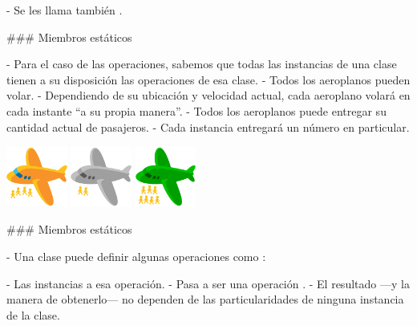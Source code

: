 \finishrboxx

- Se les llama también .

### Miembros estáticos


- Para el caso de las operaciones, sabemos que todas las instancias de una clase
tienen a su disposición las operaciones de esa clase.
    - Todos los aeroplanos pueden volar.
        - Dependiendo de su ubicación y velocidad actual, cada aeroplano volará en cada instante
        ``a su propia manera''.
    - Todos los aeroplanos puede entregar su cantidad actual de pasajeros.
        - Cada instancia entregará un número en particular.

\vfill

\columnsbegin
{}
\centering\includegraphics[width=20mm]{icons/92-emoji_android_airplane_withpeople.png}
\centering\includegraphics[width=20mm]{icons/92-emoji_android_airplane_gray_withpeople.png}
\centering\includegraphics[width=20mm]{icons/92-emoji_android_airplane_green_withpeople.png}
\columnsend

### Miembros estáticos


- Una clase puede definir algunas operaciones como :

\buildrboxx[0.9\textwidth]{}

- Las instancias  a esa operación.
- Pasa a ser una operación .
- El resultado ---y la manera de obtenerlo--- no dependen de las particularidades de ninguna instancia de la clase.

\finishrboxx

